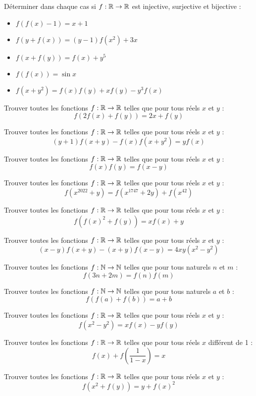 \begin{exo}
Déterminer dans chaque cas si $f:\mathbb R\to\mathbb R$ est injective, surjective et bijective :
\begin{itemize}
    \item $f(f(x)-1)=x+1$
    \item $f(y+f(x))=(y-1)f(x^2)+3x$
    \item $f(x+f(y))=f(x)+y^5$
    \item $f(f(x))=\sin x$
    \item $f(x+y^2)=f(x)f(y)+xf(y)-y^3f(x)$
\end{itemize}

\end{exo}
\begin{exo}
Trouver toutes les fonctions $f:\mathbb R\to\mathbb R$ telles que pour tous réels $x$ et $y$ : 
$$f(2f(x)+f(y))=2x+f(y)$$
\end{exo}
\begin{exo}
Trouver toutes les fonctions $f:\mathbb R\to\mathbb R$ telles que pour tous réels $x$ et $y$ : 
$$(y+1)f(x+y)-f(x)f(x+y^2)=yf(x)$$
\end{exo}
\begin{exo}
Trouver toutes les fonctions $f:\mathbb R\to\mathbb R$ telles que pour tous réels $x$ et $y$ : 
$$f(x)f(y)=f(x-y)$$
\end{exo}

\begin{exo}
Trouver toutes les fonctions $f:\mathbb R\to\mathbb R$ telles que pour tous réels $x$ et $y$ : 
$$f(x^{2022}+y)=f(x^{1747}+2y)+f(x^{42})$$
\end{exo}
\begin{exo}
Trouver toutes les fonctions $f:\mathbb R\to\mathbb R$ telles que pour tous réels $x$ et $y$ : 
$$f(f(x)^2+f(y))=xf(x)+y$$
\end{exo}
\begin{exo}
Trouver toutes les fonctions $f:\mathbb R\to\mathbb R$ telles que pour tous réels $x$ et $y$ : 
$$(x-y)f(x+y)-(x+y)f(x-y)=4xy(x^2-y^2)$$
\end{exo}
\begin{exo}
Trouver toutes les fonctions $f:\mathbb N\to\mathbb N$ telles que pour tous naturels $n$ et $m$ : 
$$f(3n+2m)=f(n)f(m)$$
\end{exo}
\begin{exo}
Trouver toutes les fonctions $f:\mathbb N\to\mathbb N$ telles que pour tous naturels $a$ et $b$ : 
$$f(f(a)+f(b))=a+b$$
\end{exo}
\begin{exo}
Trouver toutes les fonctions $f:\mathbb R\to\mathbb R$ telles que pour tous réels $x$ et $y$ : 
$$f(x^2-y^2)=xf(x)-yf(y)$$
\end{exo}
\begin{exo}
Trouver toutes les fonctions $f:\mathbb R\to\mathbb R$ telles que pour tous réels $x$ différent de 1 : 
$$f(x)+f\left(\frac1{1-x}\right)=x$$
\end{exo}
\begin{exo}
Trouver toutes les fonctions $f:\mathbb R\to\mathbb R$ telles que pour tous réels $x$ et $y$ :
$$f(x^2+f(y))=y+f(x)^2$$
\end{exo}

